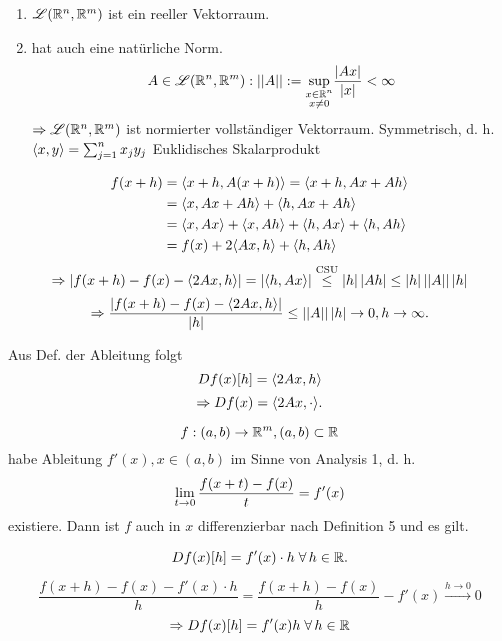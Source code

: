 \documentclass[../ana2.tex]{subfiles}
\begin{document}
\begin{bsp}[5]\leavevmode
    \begin{enumerate}
        \item \( \mathscr{L}(\mathbb{R}^n, \mathbb{R}^m) \) ist ein reeller Vektorraum.
        \item hat auch eine natürliche Norm.
        \[ A \in \mathscr{L}(\mathbb{R}^n, \mathbb{R}^m) : \left|\left|A\right|\right| := 
        \underset{\substack{x \in \mathbb{R}^n \\ x \neq 0}}{\sup} 
        \frac{\left|Ax\right|}{\left|x\right|} < \infty \]
        \( \Rightarrow \mathscr{L}(\mathbb{R}^n, \mathbb{R}^m) \) ist 
        normierter vollständiger Vektorraum.
        Symmetrisch, d. h. \( \langle x, y \rangle 
        = \sum_{j=1}^n x_j y_j \) Euklidisches Skalarprodukt
    \end{enumerate}

    \begin{align*}
        f(x + h) &= \langle x + h, A(x+h) \rangle = \langle x + h, Ax + Ah \rangle\\
        &= \langle x, Ax + Ah \rangle + \langle h, Ax + Ah \rangle \\
        &= \langle x, Ax \rangle + \langle x, Ah \rangle + \langle h, Ax \rangle + \langle h, Ah \rangle\\
        &= f(x) + 2\langle Ax, h \rangle + \langle h, Ah \rangle
    \end{align*}
    \[ \Rightarrow \left| f(x+h) - f(x) - \langle 2Ax, h \rangle \right| 
    = \left| \langle h, Ax \rangle \right| 
    \overset{\text{CSU}}{\leq} \left|h\right| \left|Ah\right| 
    \leq \left|h\right| \left|\left|A\right|\right| \left|h\right| \]
    \[ \Rightarrow \frac{\left| f(x+h) - f(x) - \langle 2Ax, h \rangle \right| }{\left|h\right|} 
    \leq \left|\left|A\right|\right| \left|h\right| \rightarrow 0, h \rightarrow \infty. \]

    Aus Def. der Ableitung folgt 
    \[ Df(x)[h] = \langle 2Ax, h \rangle \]
    \[ \Rightarrow Df(x) = \langle 2Ax, \cdot \rangle. \]
\end{bsp}
\begin{bsp}[6]
    \[ f:(a,b)\rightarrow \mathbb{R}^m, (a, b) \subset \mathbb{R} \] 
    habe Ableitung \( f'(x), x \in (a,b) \) im Sinne von Analysis 1, 
    d. h. 
    \[ \lim\limits_{t\rightarrow{}0} \frac{f(x+t) - f(x)}{t} = f'(x) \] 
    existiere. Dann ist \(f\) auch in \(x\) differenzierbar nach 
    Definition 5 und es gilt.

    \[ Df(x)[h] = f'(x) \cdot h \;\forall h \in \R. \]
    \begin{bew}
        \[ \frac{f(x+h) - f(x) - f'(x) \cdot h}{h} = \frac{f(x+h)-f(x)}{h} - f'(x)
        \overset{h \rightarrow 0}{\longrightarrow} 0 \]
        \[ \Rightarrow D f(x)[h] = f'(x)h \; \forall h \in \R \]
    \end{bew}
\end{bsp}
\end{document}
